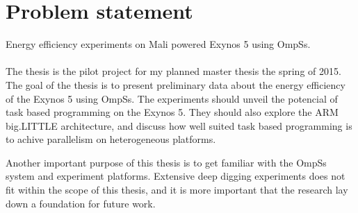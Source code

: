 \section*{Problem statement}
Energy efficiency experiments on Mali powered Exynos 5 using OmpSs.
\\
\\
The thesis is the pilot project for my planned master thesis the spring of 2015.
The goal of the thesis is to present preliminary data about the energy efficiency of the Exynos 5 using OmpSs.
The experiments should unveil the potencial of task based programming on the Exynos 5.
They should also explore the ARM big.LITTLE architecture, and discuss how well suited task based programming is to achive parallelism on heterogeneous platforms.

Another important purpose of this thesis is to get familiar with the OmpSs system and experiment platforms.
Extensive deep digging experiments does not fit within the scope of this thesis, and it is more important that the research lay down a foundation for future work.
